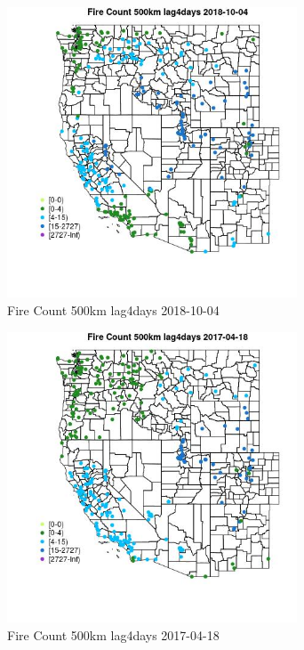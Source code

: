 \begin{figure} 
\centering  
\includegraphics[width=0.77\textwidth]{Code_Outputs/Report_ML_input_PM25_Step4_part_f_de_duplicated_aveswNAs_MapObsFire_Count_500km_lag4days2018-10-04.jpg} 
\caption{\label{fig:Report_ML_input_PM25_Step4_part_f_de_duplicated_aveswNAsMapObsFire_Count_500km_lag4days2018-10-04}Fire Count 500km lag4days 2018-10-04} 
\end{figure} 
 

\begin{figure} 
\centering  
\includegraphics[width=0.77\textwidth]{Code_Outputs/Report_ML_input_PM25_Step4_part_f_de_duplicated_aveswNAs_MapObsFire_Count_500km_lag4days2017-04-18.jpg} 
\caption{\label{fig:Report_ML_input_PM25_Step4_part_f_de_duplicated_aveswNAsMapObsFire_Count_500km_lag4days2017-04-18}Fire Count 500km lag4days 2017-04-18} 
\end{figure} 
 

